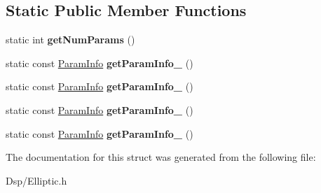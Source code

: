 \subsection*{Static Public Member Functions}
\begin{DoxyCompactItemize}
\item 
\hypertarget{structDsp_1_1Elliptic_1_1Design_1_1TypeIIBase_ae888796772b0e7527e80fa13d955de4e}{static int {\bfseries get\-Num\-Params} ()}\label{structDsp_1_1Elliptic_1_1Design_1_1TypeIIBase_ae888796772b0e7527e80fa13d955de4e}

\item 
\hypertarget{structDsp_1_1Elliptic_1_1Design_1_1TypeIIBase_acc094bdcfda3c9c074a7662513d9676d}{static const \hyperlink{classDsp_1_1ParamInfo}{Param\-Info} {\bfseries get\-Param\-Info\-\_} ()}\label{structDsp_1_1Elliptic_1_1Design_1_1TypeIIBase_acc094bdcfda3c9c074a7662513d9676d}

\item 
\hypertarget{structDsp_1_1Elliptic_1_1Design_1_1TypeIIBase_a579e095f231df2f7c160e1c4eae4df9f}{static const \hyperlink{classDsp_1_1ParamInfo}{Param\-Info} {\bfseries get\-Param\-Info\-\_} ()}\label{structDsp_1_1Elliptic_1_1Design_1_1TypeIIBase_a579e095f231df2f7c160e1c4eae4df9f}

\item 
\hypertarget{structDsp_1_1Elliptic_1_1Design_1_1TypeIIBase_ab62762e2f6f26cb85ea7a04fbc728085}{static const \hyperlink{classDsp_1_1ParamInfo}{Param\-Info} {\bfseries get\-Param\-Info\-\_} ()}\label{structDsp_1_1Elliptic_1_1Design_1_1TypeIIBase_ab62762e2f6f26cb85ea7a04fbc728085}

\item 
\hypertarget{structDsp_1_1Elliptic_1_1Design_1_1TypeIIBase_ac2ae318b9828bffc3539b10a65f331fa}{static const \hyperlink{classDsp_1_1ParamInfo}{Param\-Info} {\bfseries get\-Param\-Info\-\_} ()}\label{structDsp_1_1Elliptic_1_1Design_1_1TypeIIBase_ac2ae318b9828bffc3539b10a65f331fa}

\end{DoxyCompactItemize}


The documentation for this struct was generated from the following file\-:\begin{DoxyCompactItemize}
\item 
Dsp/Elliptic.\-h\end{DoxyCompactItemize}
